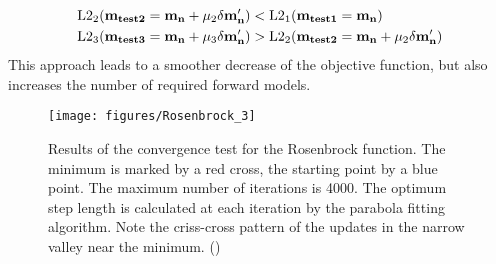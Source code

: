\begin{equation}
\begin{split}
&\rm{L2_2(\mathbf{m_{test2}} = \mathbf{m_{n}} + \mu_2 \delta \mathbf{m'_n}) < L2_1(\mathbf{m_{test1}} = \mathbf{m_{n}})}\\
&\rm{L2_3(\mathbf{m_{test3}} = \mathbf{m_{n}} + \mu_3 \delta \mathbf{m'_n}) > L2_2(\mathbf{m_{test2}} = \mathbf{m_{n}} + \mu_2 \delta \mathbf{m'_n})}\\
\end{split}
\label{parabola1:1:100}
\end{equation}              
This approach leads to a smoother decrease of the objective function, but also increases the number of required forward models.         
\begin{figure}[ht]
\begin{center}
\texttt{[image: figures/Rosenbrock\_3]}
\caption{Results of the convergence test for the Rosenbrock function. The minimum is marked by a red cross, the starting point by a blue point. The maximum number of iterations is 4000. The optimum step length is calculated at each iteration by the parabola fitting algorithm. Note the criss-cross pattern of the updates in the narrow valley near the minimum. (\cite{koehn:11})}
\label{Rosenbrock_variable}
\end{center}
\end{figure}
